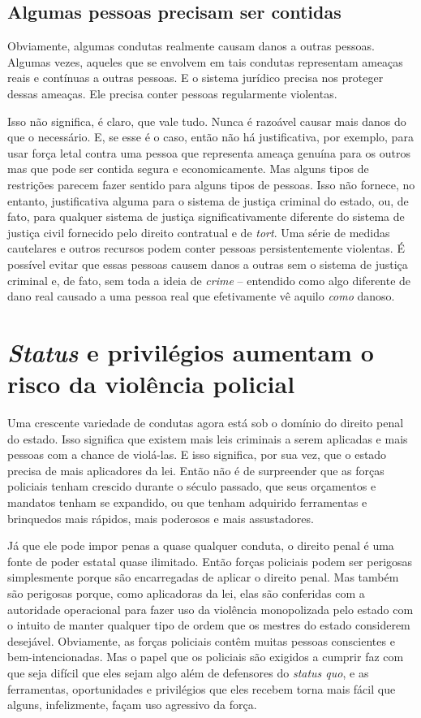 \subsection*{Algumas pessoas precisam ser contidas}

Obviamente, algumas condutas realmente causam danos a outras pessoas. Algumas vezes, aqueles que se envolvem em tais condutas representam ameaças reais e contínuas a outras pessoas. E o sistema jurídico precisa nos proteger dessas ameaças. Ele precisa conter pessoas regularmente violentas.

Isso não significa, é claro, que vale tudo. Nunca é razoável causar mais danos do que o necessário. E, se esse é o caso, então não há justificativa, por exemplo, para usar força letal contra uma pessoa que representa ameaça genuína para os outros mas que pode ser contida segura e economicamente. Mas alguns tipos de restrições parecem fazer sentido para alguns tipos de pessoas. Isso não fornece, no entanto, justificativa alguma para o sistema de justiça criminal do estado, ou, de fato, para qualquer sistema de justiça significativamente diferente do sistema de justiça civil fornecido pelo direito contratual e de \emph{tort}. Uma série de medidas cautelares e outros recursos podem conter pessoas persistentemente violentas. É possível evitar que essas pessoas causem danos a outras sem o sistema de justiça criminal e, de fato, sem toda a ideia de \emph{crime} -- entendido como algo diferente de dano real causado a uma pessoa real que efetivamente vê aquilo \emph{como} danoso.

\section{\emph{Status} e privilégios aumentam o risco da violência policial}

Uma crescente variedade de condutas agora está sob o domínio do direito penal do estado. Isso significa que existem mais leis criminais a serem aplicadas e mais pessoas com a chance de violá-las. E isso significa, por sua vez, que o estado precisa de mais aplicadores da lei. Então não é de surpreender que as forças policiais tenham crescido durante o século passado, que seus orçamentos e mandatos tenham se expandido, ou que tenham adquirido ferramentas e brinquedos mais rápidos, mais poderosos e mais assustadores.

Já que ele pode impor penas a quase qualquer conduta, o direito penal é uma fonte de poder estatal quase ilimitado. Então forças policiais podem ser perigosas simplesmente porque são encarregadas de aplicar o direito penal. Mas também são perigosas porque, como aplicadoras da lei, elas são conferidas com a autoridade operacional para fazer uso da violência monopolizada pelo estado com o intuito de manter qualquer tipo de ordem que os mestres do estado considerem desejável. Obviamente, as forças policiais contêm muitas pessoas conscientes e bem-intencionadas. Mas o papel que os policiais são exigidos a cumprir faz com que seja difícil que eles sejam algo além de defensores do \emph{status quo}, e as ferramentas, oportunidades e privilégios que eles recebem torna mais fácil que alguns, infelizmente, façam uso agressivo da força.

